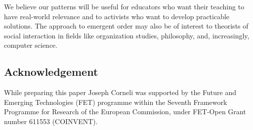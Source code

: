 We believe our patterns will be useful for educators who want their teaching to have real-world relevance and to activists who want to develop practicable solutions.   The approach to emergent order may also be of interest to theorists of social interaction in fields like organization studies, philosophy, and, increasingly, computer science.

\subsection{Acknowledgement}
While preparing this paper Joseph Corneli was supported by the Future and Emerging
Technologies (FET) programme within the Seventh Framework Programme
for Research of the European Commission, under FET-Open Grant number
611553 (COINVENT).

